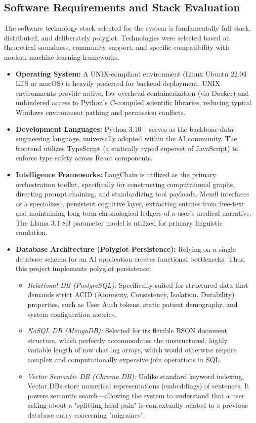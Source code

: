 \documentclass[12pt]{article}
\begin{document}
\subsection{Software Requirements and Stack Evaluation}
The software technology stack selected for the system is fundamentally full-stack, distributed, and deliberately polyglot. Technologies were selected based on theoretical soundness, community support, and specific compatibility with modern machine learning frameworks.

\begin{itemize}
    \item \textbf{Operating System:} A UNIX-compliant environment (Linux Ubuntu 22.04 LTS or macOS) is heavily preferred for backend deployment. UNIX environments provide native, low-overhead containerization (via Docker) and unhindered access to Python's C-compiled scientific libraries, reducing typical Windows environment pathing and permission conflicts.
    \item \textbf{Development Languages:} Python 3.10+ serves as the backbone data-engineering language, universally adopted within the AI community. The frontend utilizes TypeScript (a statically typed superset of JavaScript) to enforce type safety across React components.
    \item \textbf{Intelligence Frameworks:} LangChain is utilized as the primary orchestration toolkit, specifically for constructing computational graphs, directing prompt chaining, and standardizing tool payloads. Mem0 interfaces as a specialized, persistent cognitive layer, extracting entities from free-text and maintaining long-term chronological ledgers of a user’s medical narrative. The Llama 3.1 8B parameter model is utilized for primary linguistic emulation.

    \item \textbf{Database Architecture (Polyglot Persistence):} Relying on a single database schema for an AI application creates functional bottlenecks. Thus, this project implements polyglot persistence:
    \begin{itemize}
        \item \textit{Relational DB (PostgreSQL):} Specifically suited for structured data that demands strict ACID (Atomicity, Consistency, Isolation, Durability) properties, such as User Auth tokens, static patient demography, and system configuration metrics.
        \item \textit{NoSQL DB (MongoDB):} Selected for its flexible BSON document structure, which perfectly accommodates the unstructured, highly variable length of raw chat log arrays, which would otherwise require complex and computationally expensive join operations in SQL.
        \item \textit{Vector Semantic DB (Chroma DB):} Unlike standard keyword indexing, Vector DBs store numerical representations (embeddings) of sentences. It powers semantic search—allowing the system to understand that a user asking about a "splitting head pain" is contextually related to a previous database entry concerning "migraines".
    \end{itemize}
\end{itemize}
\end{document}
